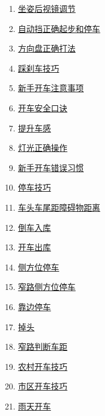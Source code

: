 \documentclass[11pt]{article}
\begin{document}
\begin{multicols}{2}
	\begin{enumerate}
		\item \href{https://mp.weixin.qq.com/s/M1gv_OHwXQVY-Lo9RXHAUw}{坐姿后视镜调节}	%
		\item \href{https://mp.weixin.qq.com/s/tsXP96y4JLIFLXqDzfQiGQ}{自动挡正确起步和停车}	%
		\item \href{https://mp.weixin.qq.com/s/nEFnjTbIn92aM6oaNuG0AQ}{方向盘正确打法}	%
		\item \href{https://mp.weixin.qq.com/s/5che0YABaGdOg7I0cFerKw}{踩刹车技巧}	%
		\item \href{https://mp.weixin.qq.com/s/ySmvpP7RnVKUV2sR1prrBg}{新手开车注意事项}	%
		\item \href{https://mp.weixin.qq.com/s/4AWKS5ZgQUNVO5qprrsa_A}{开车安全口诀}	%
		\item \href{https://mp.weixin.qq.com/s/f75qgB55OT6ka18fmqVPfA}{提升车感}	%
		\item \href{https://mp.weixin.qq.com/s/lcTjMcLicM-YJFEVAUoIiQ}{灯光正确操作}	%
		\item \href{https://mp.weixin.qq.com/s/JC241N_ukI8NtaH-qYzFKw}{新手开车错误习惯}	%
		\item \href{https://mp.weixin.qq.com/s/DZNxXg5X-k7iGbGuMBDbnA}{停车技巧}	%
		\item \href{https://mp.weixin.qq.com/s/ygR9HUKE1PueVRHL1JDZ_w}{车头车尾距障碍物距离}	%
		\item \href{https://mp.weixin.qq.com/s/jsi8DzDM-58FZfguyIVyoQ}{倒车入库}	%
		\item \href{https://mp.weixin.qq.com/s/9EOElhgmbYPHCxMualSCcw}{开车出库}	%
		\item \href{https://mp.weixin.qq.com/s/7JcrdyAvjhzkCI0uzI6UGw}{侧方位停车}	%
		\item \href{https://mp.weixin.qq.com/s/vVRLQZlzC9dwnELh4GgNBA}{窄路侧方位停车}	%
		\item \href{https://mp.weixin.qq.com/s/sjFpNS-yuiSmIwuOtmtbQw}{靠边停车}	%
		\item \href{https://mp.weixin.qq.com/s/nrqBbK95X0FxWKKc0d2BWQ}{掉头}	%
		\item \href{https://mp.weixin.qq.com/s/68hakM2updKZ9ELjw6SXdA}{窄路判断车距}	%
		\item \href{https://mp.weixin.qq.com/s/aX0sBsn1K5L4CRZmkRMusw}{农村开车技巧}	%
		\item \href{https://mp.weixin.qq.com/s/-38CJYOhjLiXj0sBr96fmw}{市区开车技巧}	%
		\item \href{https://mp.weixin.qq.com/s/LSTh1Xl6SvVnWpgx6CCETA}{雨天开车}	%

\end{enumerate}
\end{multicols}
\end{document}
